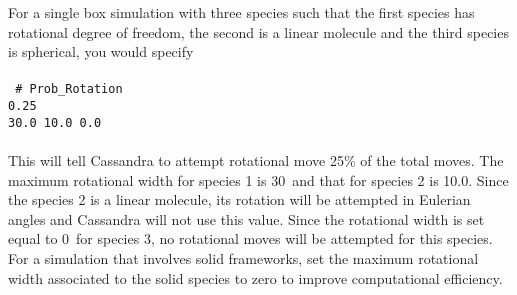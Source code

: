 For a single box simulation with three species such that the first species has rotational degree of freedom, the second is a linear molecule and the third species is spherical, you would specify \\ \\
%
\texttt{
{\# Prob\_Rotation} \\
 0.25 \\
30.0 10.0 0.0}
\\ \\
This will tell Cassandra to attempt rotational move 25\% of the total moves. 
The maximum rotational width for species 1 is 30\degree\ and that for species 2
 is 10.0\degree. Since the species 2 is a linear molecule, its rotation will
 be attempted in Eulerian angles and Cassandra will not use this value. 
Since the rotational width is set equal to 0\degree\ for species 3, no rotational moves will be attempted for this species.  \\

For a simulation that involves solid frameworks, set the
maximum rotational width associated to the solid species to zero to improve computational efficiency.
%
%
%
%
%
%
%
%
%
%
%
